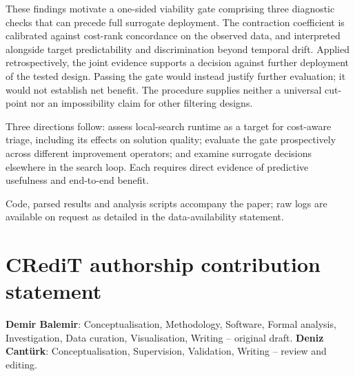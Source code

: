 \documentclass[a4paper,fleqn]{cas-dc}
\begin{document}
These findings motivate a one-sided viability gate comprising three diagnostic
checks that can precede full surrogate deployment. The contraction coefficient
is calibrated against cost-rank concordance on the observed data, and interpreted
alongside target predictability and discrimination beyond temporal drift.
Applied retrospectively, the joint evidence supports a decision against further
deployment of the tested design. Passing the gate would instead justify further
evaluation; it would not establish net benefit. The procedure supplies neither
a universal cut-point nor an impossibility claim for other filtering designs.

Three directions follow: assess local-search runtime as a target for cost-aware
triage, including its effects on solution quality; evaluate the gate prospectively
across different improvement operators; and examine surrogate decisions elsewhere
in the search loop. Each requires direct evidence of predictive usefulness and
end-to-end benefit.

Code, parsed results and analysis scripts accompany the paper; raw logs are
available on request as detailed in the data-availability statement.

%
%

\section*{CRediT authorship contribution statement}
\textbf{Demir Balemir}: Conceptualisation, Methodology, Software,
Formal analysis, Investigation, Data curation, Visualisation,
Writing -- original draft.
\textbf{Deniz Cant{\"u}rk}: Conceptualisation, Supervision, Validation,
Writing -- review and editing.
\end{document}
